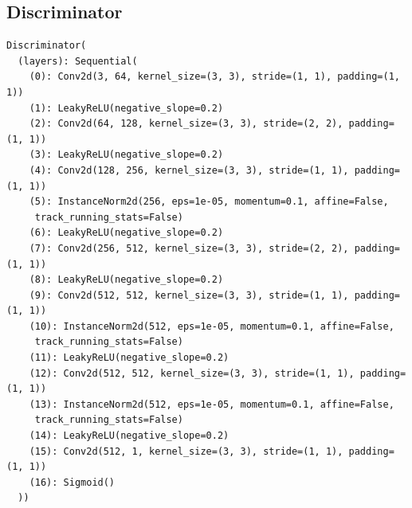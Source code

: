 \documentclass{article}
\begin{document}
\subsection*{Discriminator}
\begin{verbatim}
Discriminator(
  (layers): Sequential(
    (0): Conv2d(3, 64, kernel_size=(3, 3), stride=(1, 1), padding=(1, 1))
    (1): LeakyReLU(negative_slope=0.2)
    (2): Conv2d(64, 128, kernel_size=(3, 3), stride=(2, 2), padding=(1, 1))
    (3): LeakyReLU(negative_slope=0.2)
    (4): Conv2d(128, 256, kernel_size=(3, 3), stride=(1, 1), padding=(1, 1))
    (5): InstanceNorm2d(256, eps=1e-05, momentum=0.1, affine=False,
     track_running_stats=False)
    (6): LeakyReLU(negative_slope=0.2)
    (7): Conv2d(256, 512, kernel_size=(3, 3), stride=(2, 2), padding=(1, 1))
    (8): LeakyReLU(negative_slope=0.2)
    (9): Conv2d(512, 512, kernel_size=(3, 3), stride=(1, 1), padding=(1, 1))
    (10): InstanceNorm2d(512, eps=1e-05, momentum=0.1, affine=False,
     track_running_stats=False)
    (11): LeakyReLU(negative_slope=0.2)
    (12): Conv2d(512, 512, kernel_size=(3, 3), stride=(1, 1), padding=(1, 1))
    (13): InstanceNorm2d(512, eps=1e-05, momentum=0.1, affine=False,
     track_running_stats=False)
    (14): LeakyReLU(negative_slope=0.2)
    (15): Conv2d(512, 1, kernel_size=(3, 3), stride=(1, 1), padding=(1, 1))
    (16): Sigmoid()
  ))
\end{verbatim}
\end{document}
